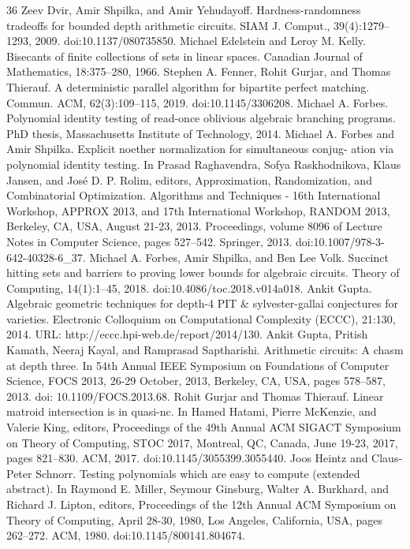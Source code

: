 \documentclass[10pt,a4paper]{article}
\begin{document}
\begin{thebibliography}{36}
Zeev Dvir, Amir Shpilka, and Amir Yehudayoff. Hardness-randomness tradeoffs for bounded depth arithmetic circuits. SIAM J. Comput., 39(4):1279–1293, 2009. doi:10.1137/080735850.
Michael Edelstein and Leroy M. Kelly. Bisecants of finite collections of sets in linear spaces. Canadian Journal of Mathematics, 18:375–280, 1966.
Stephen A. Fenner, Rohit Gurjar, and Thomas Thierauf. A deterministic parallel algorithm for bipartite perfect matching. Commun. ACM, 62(3):109–115, 2019. doi:10.1145/3306208.
Michael A. Forbes. Polynomial identity testing of read-once oblivious algebraic branching programs. PhD thesis, Massachusetts Institute of Technology, 2014.
Michael A. Forbes and Amir Shpilka. Explicit noether normalization for simultaneous conjug- ation via polynomial identity testing. In Prasad Raghavendra, Sofya Raskhodnikova, Klaus Jansen, and José D. P. Rolim, editors, Approximation, Randomization, and Combinatorial Optimization. Algorithms and Techniques - 16th International Workshop, APPROX 2013, and 17th International Workshop, RANDOM 2013, Berkeley, CA, USA, August 21-23, 2013. Proceedings, volume 8096 of Lecture Notes in Computer Science, pages 527–542. Springer, 2013. doi:10.1007/978-3-642-40328-6\_37.
Michael A. Forbes, Amir Shpilka, and Ben Lee Volk. Succinct hitting sets and barriers to proving lower bounds for algebraic circuits. Theory of Computing, 14(1):1–45, 2018. doi:10.4086/toc.2018.v014a018.
Ankit Gupta. Algebraic geometric techniques for depth-4 PIT \& sylvester-gallai conjectures for varieties. Electronic Colloquium on Computational Complexity (ECCC), 21:130, 2014. URL: http://eccc.hpi-web.de/report/2014/130.
Ankit Gupta, Pritish Kamath, Neeraj Kayal, and Ramprasad Saptharishi. Arithmetic circuits: A chasm at depth three. In 54th Annual IEEE Symposium on Foundations of Computer Science, FOCS 2013, 26-29 October, 2013, Berkeley, CA, USA, pages 578–587, 2013. doi: 10.1109/FOCS.2013.68.
Rohit Gurjar and Thomas Thierauf. Linear matroid intersection is in quasi-nc. In Hamed Hatami, Pierre McKenzie, and Valerie King, editors, Proceedings of the 49th Annual ACM SIGACT Symposium on Theory of Computing, STOC 2017, Montreal, QC, Canada, June 19-23, 2017, pages 821–830. ACM, 2017. doi:10.1145/3055399.3055440.
Joos Heintz and Claus-Peter Schnorr. Testing polynomials which are easy to compute (extended abstract). In Raymond E. Miller, Seymour Ginsburg, Walter A. Burkhard, and Richard J. Lipton, editors, Proceedings of the 12th Annual ACM Symposium on Theory of Computing, April 28-30, 1980, Los Angeles, California, USA, pages 262–272. ACM, 1980. doi:10.1145/800141.804674.

\end{thebibliography}
\end{document}
